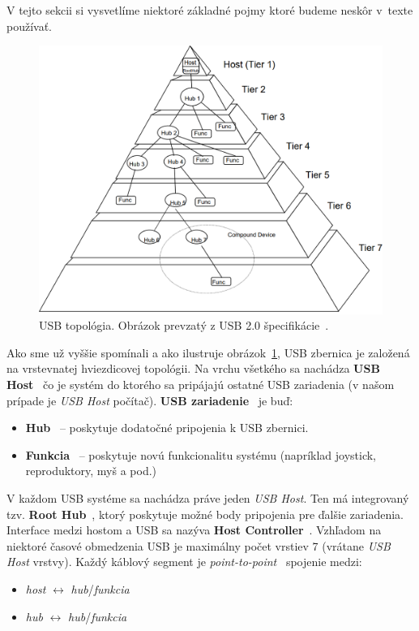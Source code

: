 V tejto sekcii si vysvetlíme niektoré základné pojmy ktoré budeme neskôr v~texte používať.

\begin{figure}[!htb]
	\centering
	\includegraphics[width=\textwidth]{img/uvod_usb_topology}
	\caption{USB topológia. Obrázok prevzatý z USB 2.0 špecifikácie~\cite{usb_topology}.}
	\label{obr:uvod:usb_topology}
\end{figure}

Ako sme už vyššie spomínali a ako ilustruje obrázok~\ref{obr:uvod:usb_topology}, USB zbernica je založená na vrstevnatej hviezdicovej topológii. Na vrchu všetkého sa nachádza \textbf{USB Host}~\cite{usb_host} čo je systém do ktorého sa pripájajú ostatné USB zariadenia (v našom prípade je \textit{USB Host} počítač). \textbf{USB zariadenie}~\cite{usb_device} je buď:
\begin{itemize}
\item \textbf{Hub}~\cite{usb_hub} -- poskytuje dodatočné pripojenia k USB zbernici.
\item \textbf{Funkcia}~\cite{usb_function} -- poskytuje novú funkcionalitu systému (napríklad joystick, reproduktory, myš a pod.)
\end{itemize}

 V každom USB systéme sa nachádza práve jeden \textit{USB Host}. Ten má integrovaný tzv. \textbf{Root Hub}~\cite{usb_host}, ktorý poskytuje možné body pripojenia pre ďalšie zariadenia. Interface medzi hostom a USB sa nazýva \textbf{Host Controller}~\cite{usb_host}. Vzhľadom na niektoré časové obmedzenia USB je maximálny počet vrstiev 7 (vrátane \textit{USB Host} vrstvy). Každý káblový segment je \textit{point-to-point}~\cite{usb_bus_topology} spojenie medzi:
\begin{itemize}
\item \textit{host} $\longleftrightarrow$ \textit{hub}/\textit{funkcia}
\item \textit{hub} $\longleftrightarrow$ \textit{hub}/\textit{funkcia}
\end{itemize}

